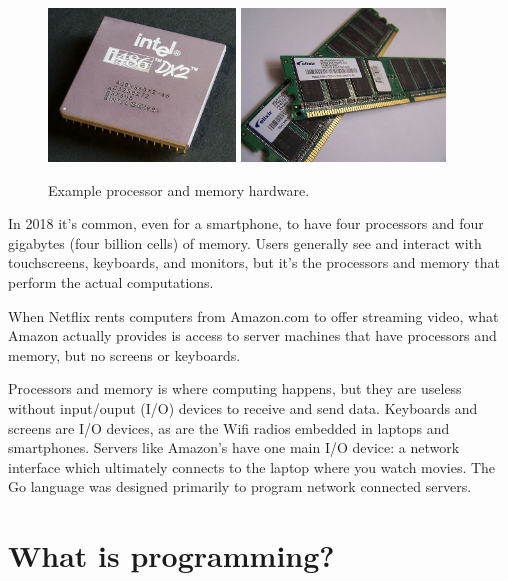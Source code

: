 \begin{figure}[!ht]
\begin{center}
\includegraphics[height=11em]{figs/CPU.jpg}
\hspace{2em}
\includegraphics[height=11em]{figs/RAM.jpg}
\caption{Example processor and memory hardware.}
\label{fig.cpuram}
\end{center}
\end{figure}

In 2018 it's common, even for a smartphone, to have four processors and four gigabytes (four billion cells) of memory.
Users generally see and interact with touchscreens, keyboards, and monitors, but it's the processors and memory that perform the actual computations.

When Netflix rents computers from Amazon.com to offer streaming video, what Amazon actually provides is access to server machines that have processors and memory, but no screens or keyboards.

Processors and memory is where computing happens, but they are useless without input/ouput (I/O) devices to receive and send data.
Keyboards and screens are I/O devices, as are the Wifi radios embedded in laptops and smartphones.
Servers like Amazon's have one main I/O device: a network interface which ultimately connects to the laptop where you watch movies.
The Go language was designed primarily to program network connected servers.


\section{What is programming?}

